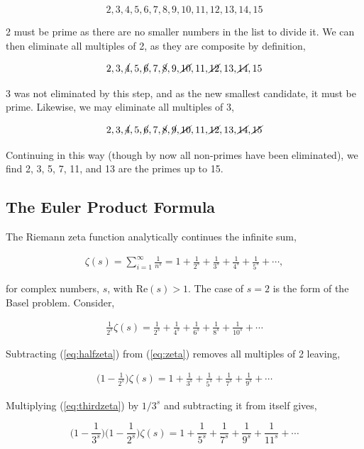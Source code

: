 \documentclass[11pt]{amsart}
\begin{document}
$$2, 3, 4, 5, 6, 7, 8, 9, 10, 11, 12, 13, 14, 15$$

2 must be prime as there are no smaller numbers in the list to divide it. We can then eliminate all multiples of 2, as they are composite by definition,

$$2, 3, \cancel{4}, 5, \cancel{6}, 7, \cancel{8}, 9, \cancel{10}, 11, \cancel{12}, 13, \cancel{14}, 15$$

3 was not eliminated by this step, and as the new smallest candidate, it must be prime. Likewise, we may eliminate all multiples of 3,

$$2, 3, \cancel{4}, 5, \cancel{6}, 7, \cancel{8}, \cancel{9}, \cancel{10}, 11, \cancel{12}, 13, \cancel{14}, \cancel{15}$$

Continuing in this way (though by now all non-primes have been eliminated), we find 2, 3, 5, 7, 11, and 13 are the primes up to 15.

\subsection{The Euler Product Formula}

The Riemann zeta function analytically continues the infinite sum,

\begin{align}\zeta(s) = \sum_{i=1}^{\infty}\frac{1}{n^s} = 1 + \frac{1}{2^s} + \frac{1}{3^s} + \frac{1}{4^s} + \frac{1}{5^s} + \cdots,\label{eq:zeta}
\end{align}

for complex numbers, $s$, with $\text{Re}(s) > 1$. The case of $s = 2$ is the form of the Basel problem. Consider,

\begin{align}\frac{1}{2^s}\zeta(s) = \frac{1}{2^s} + \frac{1}{4^s} + \frac{1}{6^s} + \frac{1}{8^s} + \frac{1}{10^s} + \cdots \label{eq:halfzeta}
\end{align}

Subtracting (\ref{eq:halfzeta}) from (\ref{eq:zeta}) removes all multiples of 2 leaving,

\begin{align}\Big(1 - \frac{1}{2^s}\Big)\zeta(s) = 1 + \frac{1}{3^s} + \frac{1}{5^s} + \frac{1}{7^s} + \frac{1}{9^s} + \cdots \label{eq:thirdzeta}
\end{align}

Multiplying (\ref{eq:thirdzeta}) by $1/3^s$ and subtracting it from itself gives,

$$\Big(1 - \frac{1}{3^s}\Big)\Big(1 - \frac{1}{2^s}\Big)\zeta(s) = 1 + \frac{1}{5^s} + \frac{1}{7^s} + \frac{1}{9^s} + \frac{1}{11^s} + \cdots$$
\end{document}
